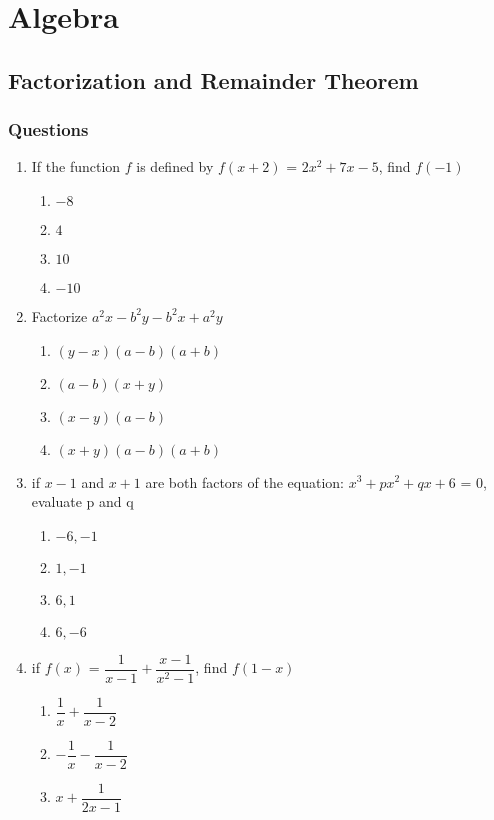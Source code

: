 \chapter{Algebra}
\section{Factorization and Remainder Theorem}
\subsection{Questions}
\begin{multicols}{2}
\begin{enumerate}[label={\arabic*.}]
\item If the function \(f\) is defined by \(f(x+2)\) = \(2{x}^{2} + 7x -5\), find \(f(-1)\)
	\begin{enumerate}[label={\Alph*.}]
	\item \(-8\)
	\item \(4\)
	\item \(10\)
	\item \(-10\)
	\end{enumerate}
\item Factorize \(a^2x - b^2y - b^2x + a^2y\)
	\begin{enumerate}[label={\Alph*.}]
	\item \((y-x)(a-b)(a+b)\)
	\item \((a-b)(x+y)\)
	\item \((x-y)(a-b)\)
	\item \((x+y)(a-b)(a+b)\)
	\end{enumerate}
\item if \(x - 1\) and \(x + 1\) are both factors of the equation: \({x}^{3} + p{x}^{2} + qx + 6 \) = 0, 
evaluate p and q
	\begin{enumerate}[label={\Alph*.}]
	\item \(-6, -1\)
	\item \(1, -1\)
	\item \(6, 1\)
	\item \(6, -6\)
	\end{enumerate}
\item if \(f(x)\) = \(\dfrac{1}{x - 1} + \dfrac{x - 1}{{x}^{2} - 1}\), find \(f(1 - x)\)
	\begin{enumerate}[label={\Alph*.}]
	\item \(\dfrac{1}{x} + \dfrac{1}{x - 2}\)
	\item \( -\dfrac{1}{x} - \dfrac{1}{x - 2}\)
	\item \(x + \dfrac{1}{2x - 1}\)

\end{enumerate}
\end{enumerate}
\end{multicols}
